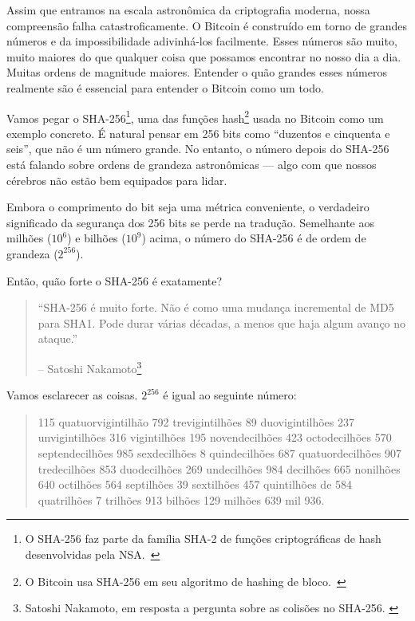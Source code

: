 Assim que entramos na escala astronômica da criptografia moderna, nossa compreensão falha catastroficamente. O Bitcoin é construído em torno de grandes números e da impossibilidade adivinhá-los facilmente. Esses números são muito, muito maiores do que qualquer coisa que possamos encontrar no nosso dia a dia. Muitas ordens de magnitude maiores. Entender o quão grandes esses números realmente são é essencial para entender o Bitcoin como um todo.

Vamos pegar o SHA-256\footnote{O SHA-256 faz parte da família SHA-2 de funções criptográficas de hash desenvolvidas pela NSA.~\cite{wiki:sha2}}, uma das funções hash\footnote{O Bitcoin usa SHA-256 em seu algoritmo de hashing de bloco.~\cite{btcwiki:block-hashing}} usada no Bitcoin como um exemplo concreto. É natural pensar em 256 bits como \enquote{duzentos e cinquenta e seis}, que não é um número grande. No entanto, o número depois do SHA-256 está falando sobre ordens de grandeza astronômicas --- algo com que nossos cérebros não estão bem equipados para lidar.

Embora o comprimento do bit seja uma métrica conveniente, o verdadeiro significado da segurança dos 256 bits se perde na tradução. Semelhante aos milhões ($10^6$) e bilhões ($10^9$) acima, o número do SHA-256 é de ordem de grandeza ($2^{256}$).

Então, quão forte o SHA-256 é exatamente?

\begin{quotation}\begin{samepage}
\enquote{SHA-256 é muito forte. Não é como uma mudança incremental de MD5 para SHA1. Pode durar várias décadas, a menos que haja algum avanço no ataque.}
\begin{flushright} -- Satoshi Nakamoto\footnote{Satoshi Nakamoto, em resposta a pergunta sobre as colisões no SHA-256. \cite{satoshi-sha256}}
\end{flushright}\end{samepage}\end{quotation}

Vamos esclarecer as coisas. $2^{256}$ é igual ao seguinte número:

\begin{quotation}\begin{samepage}
    115 quatuorvigintilhão 792 trevigintilhões 89 duovigintilhões 237 unvigintilhões 316 vigintilhões 195 novendecilhões 423 octodecilhões 570 septendecilhões 985 sexdecilhões 8 quindecilhões 687 quatuordecilhões 907 tredecilhões 853 duodecilhões 269 undecilhões 984 decilhões 665 nonilhões 640 octilhões 564 septilhões 39 sextilhões 457 quintilhões de 584 quatrilhões 7 trilhões 913 bilhões 129 milhões 639 mil 936.
\end{samepage}\end{quotation}

